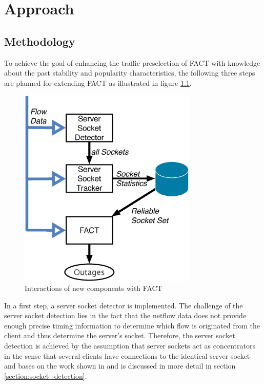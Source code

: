 

\chapter{Approach
\label{chapter:approach}}

\section{Methodology
\label{section:methodology}}

To achieve the goal of enhancing the traffic preselection of FACT with
knowledge about the past stability and popularity characteristics, the following
three steps are planned for extending FACT as illustrated in figure
\ref{fig:FACT}.
\begin{figure}
	[ht] \centering
	\includegraphics[width=8.5cm]{images/Approach_blockdiagram.eps}
	\caption{Interactions of new components with FACT} 
	\label{fig:FACT} 
\end{figure}

In a first step, a server socket detector is implemented. The challenge of the
server socket detection lies in the fact that the netflow data does not provide
enough precise timing information to determine which flow is originated from the
client and thus determine the server's socket. Therefore, the server socket
detection is achieved by the assumption that server sockets act as concentrators
in the sense that several clients have connections to the identical server
socket and bases on the work shown in
\cite{Schatzmann:Dissection,Schatzmann:Mining,Schatzmann:Tracing} and is
discussed in more detail in section \ref{section:socket_detection}.

